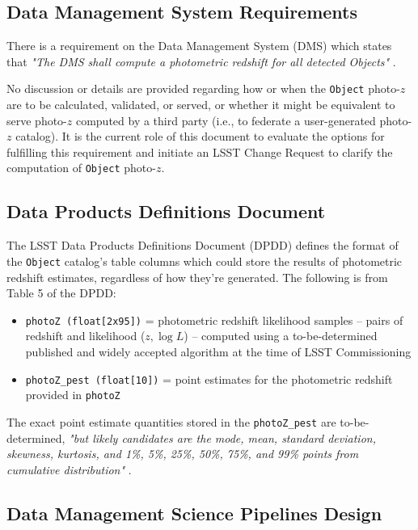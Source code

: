 \documentclass[DM,lsstdraft,toc]{lsstdoc}
\begin{document}
\subsection{Data Management System Requirements}\label{ssec:docs_dmsr}

There is a requirement on the Data Management System (DMS) which states that {\it "The DMS shall compute a photometric redshift for all detected Objects"} . 

No discussion or details are provided regarding how or when the {\tt Object} photo-$z$ are to be calculated, validated, or served, or whether it might be equivalent to serve photo-$z$ computed by a third party (i.e., to federate a user-generated photo-$z$ catalog).
It is the current role of this document to evaluate the options for fulfilling this requirement and initiate an LSST Change Request to clarify the computation of {\tt Object} photo-$z$.

\subsection{Data Products Definitions Document}\label{ssec:docs_dpdd}

The LSST Data Products Definitions Document (DPDD)  defines the format of the {\tt Object} catalog's table columns which could store the results of photometric redshift estimates, regardless of how they're generated. 
The following is from Table 5 of the DPDD:
\vspace{-15pt}
\begin{itemize}
\item \texttt{photoZ (float[2x95])} = photometric redshift likelihood samples -- pairs of redshift and likelihood ($z,\log{L}$) -- computed using a to-be-determined published and widely accepted algorithm at the time of LSST Commissioning
\item \texttt{photoZ\_pest (float[10])} = point estimates for the photometric redshift provided in {\tt photoZ}
\end{itemize}

The exact point estimate quantities stored in the \texttt{photoZ\_pest} are to-be-determined, {\it "but likely candidates are the mode, mean, standard deviation, skewness, kurtosis, and 1\%, 5\%, 25\%, 50\%, 75\%, and 99\% points from cumulative distribution"} . 

\subsection{Data Management Science Pipelines Design}\label{ssec:docs_ldm151}
\end{document}
